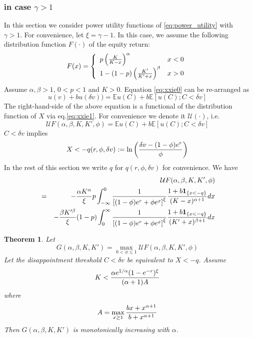 \documentclass{article}
\newcommand{\E}{
  \mathbb{E}
}
\newcommand{\1}[1]{
  \mathbf{1}_{\{#1\}}
}
\newtheorem{theorem}{Theorem}
\begin{document}

\subsubsection[in case gamma > 1]{in case $\gamma > 1$}
In this section we consider power utility functions of
\eqref{eq:power_utility} with $\gamma > 1$. For convenience,
let $\xi = \gamma - 1$. In this case, we assume the following
distribution function $F(\cdot)$ of the equity return:
\begin{equation*}
  F(x) = \left\{
  \begin{array}{ll}
    p \left(
    {K \over K - x}
    \right)^\alpha & x < 0 \\
    1 - (1 - p) \left(
    {K' \over K' + x}
    \right)^\beta & x > 0
  \end{array}
  \right.
\end{equation*}
Assume $\alpha, \beta > 1$, $0 < p < 1$ and $K > 0$.
Equation
\eqref{eq:xxie0} can be re-arranged as
\[
u(v) + b u(\delta v))
=
\E u(C) + b \E [u(C); C < \delta v]
\]
The right-hand-side of the above equation is a functional of the
distribution function of $X$ via eq.\eqref{eq:xxie1}. For convenience
we denote it $\mathcal U(\cdot)$, i.e.
\[
\mathcal U F (\alpha, \beta, K, K', \phi)
= 
\E u(C) + b \E [u(C); C < \delta v]
\]
$C < \delta v$ implies
\[
X < -q(r, \phi, \delta v) := \ln \left( {
  \delta v - (1 - \phi) e^r
  \over
  \phi
} \right)
\]
In the rest of this section we write $q$ for $q(r, \phi, \delta v)$
for convenience. We have
\begin{eqnarray}
  && \mathcal U F (\alpha, \beta, K, K', \phi) \nonumber \\
  &=&
  -{\alpha K^\alpha \over \xi} p
  \int_{-\infty}^0
      {
       1 \over \left[ (1 - \phi) e^r + \phi e^x \right]^{\xi}
      }
  {1 + b \1{x < -q} \over (K - x)^{\alpha + 1}} dx \nonumber \\
  && -{\beta K'^\beta \over \xi} (1 - p)
  \int_{0}^\infty
  {
   1 \over \left[ (1 - \phi) e^r + \phi e^x \right]^{\xi}
  }
  {1 + b \1{x < -q} \over (K' + x)^{\beta + 1}} dx
  \label{eq:xxie1.0}
\end{eqnarray}

\begin{theorem}
  Let
  \[
  G(\alpha, \beta, K, K') =
  \max_{0 < \phi \leq 1} \mathcal U F(\alpha, \beta, K, K', \phi)
  \]
  Let the disappointment threshold $C < \delta v$ be equivalent to $X < -q$. Assume
  \begin{equation}
    \label{eq:xxie1.1}
    K < {
      \alpha e^{1/\alpha} (1 - e^{-r})^\xi
      \over
      (\alpha + 1) A
    }
  \end{equation}
  where
  \[
  A = \max_{x \geq 1} {b x + x^{\alpha + 1} \over b + x^{\alpha + 1}}
  \]
  Then $G(\alpha, \beta, K, K')$ is monotonically increasing with $\alpha$.
\end{theorem}
\end{document}
